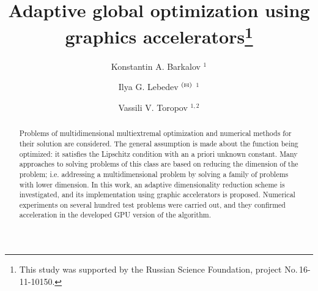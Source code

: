\documentclass{svproc}
\def\letter{$^{\textrm{(\Letter)}}$}
\begin{document}
\mainmatter              %
%
\title{Adaptive global optimization using graphics accelerators\thanks{This study was supported by the Russian Science Foundation, project No.\,16-11-10150.}
}
%
%
\author{
Konstantin A. Barkalov%
$^1$ \and
Ilya G. Lebedev \letter%
$^1$ \and 
Vassili V. Toropov%
$^{1,2}$
}

%
%
%


	
\maketitle              %

\begin{abstract}

Problems of multidimensional multiextremal optimization and numerical methods for their solution are considered. The general assumption is made about the function being optimized: it satisfies the Lipschitz condition with an a priori unknown constant. Many approaches to solving problems of this class are based on reducing the dimension of the problem; i.e. addressing a multidimensional problem by solving a family of problems with lower dimension. In this work, an adaptive dimensionality reduction scheme is investigated, and its implementation using graphic accelerators is proposed. Numerical experiments on several hundred test problems were carried out, and they confirmed acceleration in the developed GPU version of the algorithm.


\end{abstract}
\end{document}

